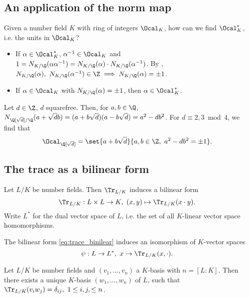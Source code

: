 
\subsection*{An application of the norm map}

Given a number field \( K \) with ring of integers \( \Ocal_K \), how can we find \( \Ocal_K^* \), i.e. the units in \( \Ocal_K \)?
\begin{itemize}
	\item If \( \alpha \in \Ocal_K^* \), \( \alpha^{-1} \in \Ocal_K \) and \( 1 = N_{K/\Q}(\alpha \alpha^{-1}) = N_{K/\Q}(\alpha) \cdot N_{K/\Q}(\alpha^{-1}) \).
		By , \( N_{K/\Q}(\alpha),\ N_{K/\Q}(\alpha^{-1}) \in \Z \implies N_{K/\Q}(\alpha) = \pm 1 \).
	\item If \( \alpha \in \Ocal_K \) with \( N_{K/\Q}(\alpha) = \pm 1 \), then \( \alpha \in \Ocal_K^* \).
\end{itemize}

\begin{exmp*}
	Let \( d \in \Z \), \( d \) squarefree.
	Then, for \( a, b \in \Q \), \( N_{\Q[\sqrt{d}]/\Q}(a + \sqrt{d}b) = (a+b\sqrt{d}) (a - b\sqrt{d}) = a^2 - db^2 \).
	For \( d \equiv 2,3 \bmod 4 \), we find that
	\[ \Ocal_{\Q[\sqrt{d}]} = \set{a+b\sqrt{d}}{a,b \in \Z,\ a^2-db^2 = \pm 1}. \]
\end{exmp*}


\subsection*{The trace as a bilinear form}

Let \( L/K \) be number fields.
Then \( \Tr_{L/K} \) induces a bilinear form
\begin{equation}\label{eq:trace_binilear}
	\Tr_{L/K}: L \times L \to K,\ (x,y) \mapsto \Tr_{L/K}(x \cdot y).
\end{equation}
Write \( L^* \) for the dual vector space of \( L \), i.e. the set of all \( K \)-linear vector space homomorphisms.

\begin{thmn}
	The bilinear form \eqref{eq:trace_binilear} induces an isomorphism of \( K \)-vector spaces
	\[ \psi: L \to L^*,\ x \to \Tr_{L/K}(x,\cdot). \]
\end{thmn}

\begin{cor}
	Let \( L/K \) be number fields and \( (v_1, \dotsc, v_n) \) a \( K \)-basis with \( n = [L:K] \).
	Then there exists a unique \( K \)-basis \( (w_1, \dotsc, w_n) \) of \( L \), such that \( \Tr_{L/K}(v_iw_j) = \delta_{ij},\ 1 \leq i,j, \leq n \).
\end{cor}


